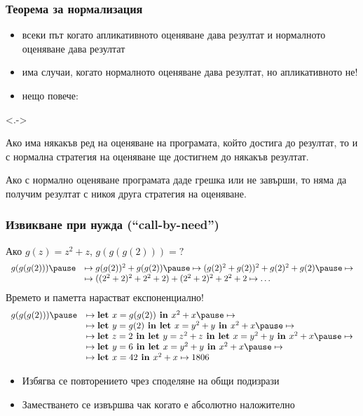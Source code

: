 \documentclass{beamer}
\begin{document}
\begin{frame}
  \frametitle{Теорема за нормализация}

  \begin{itemize}[<+->]
  \item всеки път когато апликативното оценяване дава резултат и нормалното оценяване дава резултат
  \item има случаи, когато нормалното оценяване дава резултат, но апликативното не!
  \item нещо повече:
  \end{itemize}
  \onslide<.->
  \begin{theorem}
    Ако има някакъв ред на оценяване на програмата, който достига до резултат, то и с нормална стратегия на оценяване ще достигнем до някакъв резултат.
  \end{theorem}
  \onslide<+->
  \begin{corollary}
    Ако с нормално оценяване програмата даде грешка или не завърши, то няма да получим резултат с \alert{никоя друга стратегия на оценяване}.
  \end{corollary}
\end{frame}

\begin{frame}
  \frametitle{Извикване при нужда (``call-by-need'')}

Ако $g(z) = z^2 + z$, $g(g(g(2))) = ?$
\pause
\begin{equation*}
  \begin{array}{rl}
  g(g(g(2))) \pause &\mapsto g(g(2))^2 + g(g(2)) \pause\mapsto (g(2)^2+ g(2))^2 + g(2)^2 + g(2) \pause\mapsto\\
  &\mapsto ((2^2+2)^2+2^2+2)+(2^2+2)^2 + 2^2+2 \mapsto \ldots
  \end{array}
\end{equation*}\pause
Времето и паметта нарастват експоненциално!\\
\pause
{}
\pause
\begin{equation*}
  \begin{array}{rl}
    g(g(g(2))) \pause &\mapsto \lett{x = g(g(2))}{x^2 + x}\pause \mapsto\\
    &\mapsto \lett{y=g(2)}{\lett{x=y^2+y}{x^2 + x}} \pause \mapsto\\
    &\mapsto \lett{z=2}{\lett{y=z^2+z}{\lett{x=y^2+y}{x^2 + x}}} \pause \mapsto\\
    &\mapsto \lett{y=6}{\lett{x = y^2+y}{x^2 + x}} \pause \mapsto\\
    &\mapsto \lett{x=42}{x^2 + x} \mapsto 1806
  \end{array}
\end{equation*}\pause\vspace{-1.5em}
\begin{itemize}[<+->]
\item Избягва се повторението чрез споделяне на общи подизрази
\item Заместването се извършва чак когато е \alert{абсолютно наложително}
\end{itemize}
\end{frame}
\end{document}
